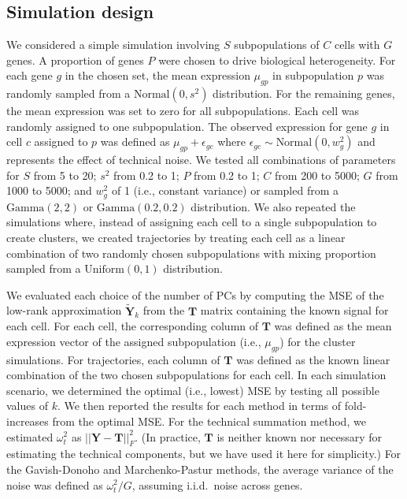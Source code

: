 \documentclass[10pt,letterpaper]{article}
\begin{document}
\subsection{Simulation design}
We considered a simple simulation involving $S$ subpopulations of $C$ cells with $G$ genes.
A proportion of genes $P$ were chosen to drive biological heterogeneity.
For each gene $g$ in the chosen set, the mean expression $\mu_{gp}$ in subpopulation $p$ was randomly sampled from a $\mbox{Normal}(0, s^2)$ distribution.
For the remaining genes, the mean expression was set to zero for all subpopulations.
Each cell was randomly assigned to one subpopulation.
The observed expression for gene $g$ in cell $c$ assigned to $p$ was defined as $\mu_{gp} + \epsilon_{gc}$ where $\epsilon_{gc} \sim \mbox{Normal}(0, w^2_g)$ and represents the effect of technical noise.
We tested all combinations of parameters for $S$ from 5 to 20; $s^2$ from 0.2 to 1; $P$ from 0.2 to 1; $C$ from 200 to 5000; $G$ from 1000 to 5000;
and $w^2_g$ of 1 (i.e., constant variance) or sampled from a $\mbox{Gamma}(2,2)$ or $\mbox{Gamma}(0.2,0.2)$ distribution.
We also repeated the simulations where, instead of assigning each cell to a single subpopulation to create clusters,
we created trajectories by treating each cell as a linear combination of two randomly chosen subpopulations with mixing proportion sampled from a $\mbox{Uniform}(0, 1)$ distribution.

We evaluated each choice of the number of PCs by computing the MSE of the low-rank approximation $\mathbf{\tilde Y}_{k}$ from the $\mathbf{T}$ matrix containing the known signal for each cell.
For each cell, the corresponding column of $\mathbf{T}$ was defined as the mean expression vector of the assigned subpopulation (i.e., $\mu_{gp}$) for the cluster simulations.
For trajectories, each column of $\mathbf{T}$ was defined as the known linear combination of the two chosen subpopulations for each cell.
In each simulation scenario, we determined the optimal (i.e., lowest) MSE by testing all possible values of $k$.
We then reported the results for each method in terms of fold-increases from the optimal MSE.
For the technical summation method, we estimated $\omega^2_t$ as $||\mathbf{Y} - \mathbf{T}||^2_F$.
(In practice, $\mathbf{T}$ is neither known nor necessary for estimating the technical components, but we have used it here for simplicity.)
For the Gavish-Donoho and Marchenko-Pastur methods, the average variance of the noise was defined as $\omega^2_t/G$, assuming i.i.d.\ noise across genes.
\end{document}
